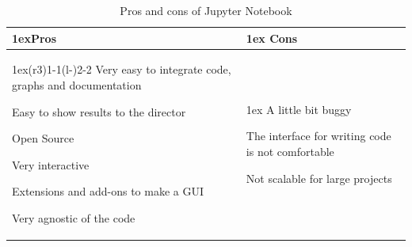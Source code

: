 \documentclass{article}
\begin{document}
    \begin{table}[H]
    \begin{tabularx}{\linewidth}{>{\parskip1ex}X@{\kern4\tabcolsep}>{\parskip1ex}X}
    \toprule
    \hfil\bfseries Pros
    &
    \hfil\bfseries Cons
    \\\cmidrule(r{3\tabcolsep}){1-1}\cmidrule(l{-\tabcolsep}){2-2}
    Very easy to integrate code, graphs and documentation\par
    Easy to show results to the director\par
    Open Source\par
    Very interactive\par
    Extensions and add-ons to make a GUI\par
    Very agnostic of the code\par
    &
    A little bit buggy\par
    The interface for writing code is not comfortable\par
    Not scalable for large projects\par
    \\\bottomrule
    \end{tabularx}
    \caption{Pros and cons of Jupyter Notebook}
    \end{table}
\end{document}
